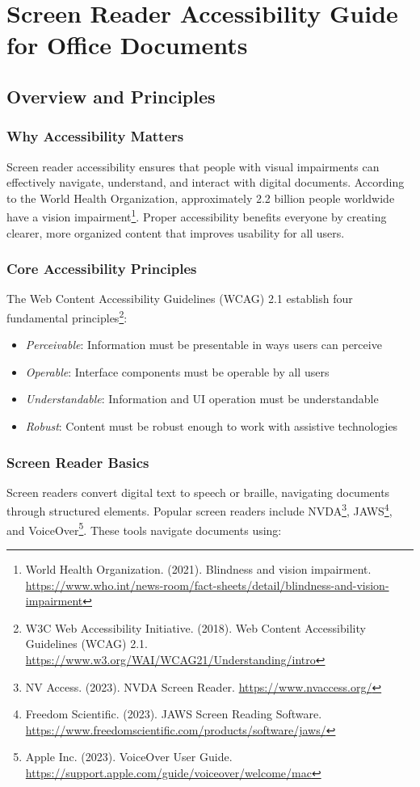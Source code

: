 \chapter{Screen Reader Accessibility Guide for Office Documents}
\label{chap:screenreader-office}

\section{Overview and Principles}
\label{sec:overview-principles}

\subsection{Why Accessibility Matters}
Screen reader accessibility ensures that people with visual impairments can effectively navigate, understand, and interact with digital documents. According to the World Health Organization, approximately 2.2 billion people worldwide have a vision impairment\footnote{World Health Organization. (2021). Blindness and vision impairment. \url{https://www.who.int/news-room/fact-sheets/detail/blindness-and-vision-impairment}}. Proper accessibility benefits everyone by creating clearer, more organized content that improves usability for all users.

\subsection{Core Accessibility Principles}
The Web Content Accessibility Guidelines (WCAG) 2.1 establish four fundamental principles\footnote{W3C Web Accessibility Initiative. (2018). Web Content Accessibility Guidelines (WCAG) 2.1. \url{https://www.w3.org/WAI/WCAG21/Understanding/intro}}:

\begin{itemize}
\item \emph{Perceivable}: Information must be presentable in ways users can perceive
\item \emph{Operable}: Interface components must be operable by all users
\item \emph{Understandable}: Information and UI operation must be understandable
\item \emph{Robust}: Content must be robust enough to work with assistive technologies
\end{itemize}

\subsection{Screen Reader Basics}
Screen readers convert digital text to speech or braille, navigating documents through structured elements. Popular screen readers include NVDA\footnote{NV Access. (2023). NVDA Screen Reader. \url{https://www.nvaccess.org/}}, JAWS\footnote{Freedom Scientific. (2023). JAWS Screen Reading Software. \url{https://www.freedomscientific.com/products/software/jaws/}}, and VoiceOver\footnote{Apple Inc. (2023). VoiceOver User Guide. \url{https://support.apple.com/guide/voiceover/welcome/mac}}. These tools navigate documents using:

